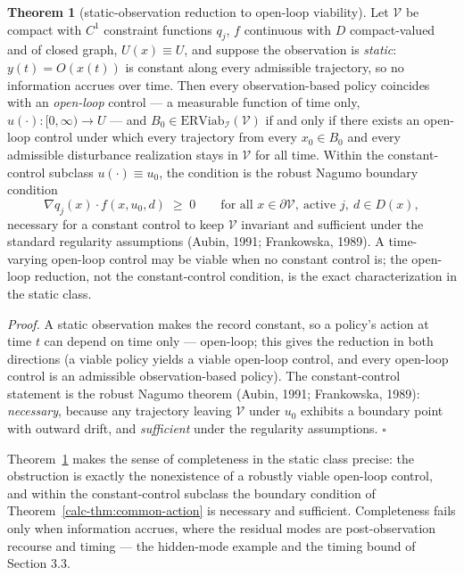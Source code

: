\documentclass[10pt,twocolumn]{article}
\theoremstyle{definition}
\newtheorem{theorem}{Theorem}
\begin{document}
\begin{theorem}[static-observation reduction to open-loop viability]\label{calc-thm:static-complete}
Let \(\mathcal{V}\) be compact with \(C^{1}\) constraint functions \(q_{j}\), \(f\) continuous with \(D\) compact-valued and of closed graph, \(U(x) \equiv U\), and suppose the observation is \emph{static}: \(y(t) = O(x(t))\) is constant along every admissible trajectory, so no information accrues over time. Then every observation-based policy coincides with an \emph{open-loop} control --- a measurable function of time only, \(u(\cdot):[0,\infty)\to U\) --- and \(B_{0} \in \mathrm{ERViab}_{\mathcal{I}}(\mathcal{V})\) if and only if there exists an open-loop control under which every trajectory from every \(x_{0} \in B_{0}\) and every admissible disturbance realization stays in \(\mathcal{V}\) for all time. Within the constant-control subclass \(u(\cdot) \equiv u_{0}\), the condition is the robust Nagumo boundary condition
\[
\nabla q_{j}(x) \cdot f(x, u_{0}, d) \;\ge\; 0
\qquad \text{for all } x \in \partial\mathcal{V},\ \text{active } j,\ d \in D(x),
\]
necessary for a constant control to keep \(\mathcal{V}\) invariant and sufficient under the standard regularity assumptions (Aubin, 1991; Frankowska, 1989). A time-varying open-loop control may be viable when no constant control is; the open-loop reduction, not the constant-control condition, is the exact characterization in the static class.
\end{theorem}

\emph{Proof.} A static observation makes the record constant, so a policy's action at time \(t\) can depend on time only --- open-loop; this gives the reduction in both directions (a viable policy yields a viable open-loop control, and every open-loop control is an admissible observation-based policy). The constant-control statement is the robust Nagumo theorem (Aubin, 1991; Frankowska, 1989): \emph{necessary}, because any trajectory leaving \(\mathcal{V}\) under \(u_{0}\) exhibits a boundary point with outward drift, and \emph{sufficient} under the regularity assumptions. \hfill\(\square\)

Theorem~\ref{calc-thm:static-complete} makes the sense of completeness in the static class precise: the obstruction is exactly the nonexistence of a robustly viable open-loop control, and within the constant-control subclass the boundary condition of Theorem~\ref{calc-thm:common-action} is necessary and sufficient. Completeness fails only when information accrues, where the residual modes are post-observation recourse and timing --- the hidden-mode example and the timing bound of Section 3.3.
\end{document}
